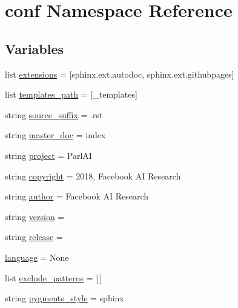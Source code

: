 \hypertarget{namespaceconf}{}\section{conf Namespace Reference}
\label{namespaceconf}
\subsection*{Variables}
\begin{DoxyCompactItemize}
\item 
list \hyperlink{namespaceconf_ae475e080536acb271a0a0efe56c3ba42}{extensions} = \mbox{[}\textquotesingle{}sphinx.\+ext.\+autodoc\textquotesingle{}, \textquotesingle{}sphinx.\+ext.\+githubpages\textquotesingle{}\mbox{]}
\item 
list \hyperlink{namespaceconf_ae850ae634911b713e036b43894fdd525}{templates\+\_\+path} = \mbox{[}\textquotesingle{}\+\_\+templates\textquotesingle{}\mbox{]}
\item 
string \hyperlink{namespaceconf_a10af2a769eb3bd3322e874f677e435b1}{source\+\_\+suffix} = \textquotesingle{}.rst\textquotesingle{}
\item 
string \hyperlink{namespaceconf_a6fcd7e5236f355b1e1a55f9d95988810}{master\+\_\+doc} = \textquotesingle{}index\textquotesingle{}
\item 
string \hyperlink{namespaceconf_a45653c983098153b78e33600e39230eb}{project} = \textquotesingle{}Parl\+AI\textquotesingle{}
\item 
string \hyperlink{namespaceconf_a33fa97cf51dcb25970fbf53f10159589}{copyright} = \textquotesingle{}2018, Facebook AI Research\textquotesingle{}
\item 
string \hyperlink{namespaceconf_a637c239d256432248aa8d9f3ab0b8c52}{author} = \textquotesingle{}Facebook AI Research\textquotesingle{}
\item 
string \hyperlink{namespaceconf_ade15c5b54093b64d7c428ec19ca5b1cb}{version} = \textquotesingle{}\textquotesingle{}
\item 
string \hyperlink{namespaceconf_a325dc746d8bf05c54d26351c35a21d90}{release} = \textquotesingle{}\textquotesingle{}
\item 
\hyperlink{namespaceconf_ad76a2e6d7bfa880ebb4042c08e8b4e12}{language} = None
\item 
list \hyperlink{namespaceconf_a7ad48fb6f3e9b129c02346ea0d3527c1}{exclude\+\_\+patterns} = \mbox{[}$\,$\mbox{]}
\item 
string \hyperlink{namespaceconf_a641130e096b26cba8a5d63ed38684de7}{pygments\+\_\+style} = \textquotesingle{}sphinx\textquotesingle{}

\end{DoxyCompactItemize}
